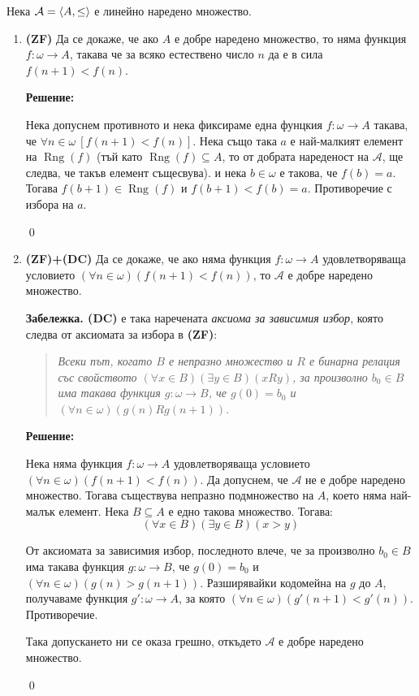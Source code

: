 \begin{problem}
Нека $\mathcal{A} = \langle A, \leq \rangle$ е линейно наредено множество.
\begin{enumerate}
\item
\textbf{(ZF)} Да се докаже, че ако $A$ е добре наредено множество, то
няма функция $f: \omega \to A$, такава че за всяко естествено число $n$ да
е в сила $f (n + 1) < f (n)$.

\textbf{Решение:}

\smallbreak
\quad
Нека допуснем противното и
нека фиксираме една фунцкия $f: \omega \to A$ такава, че $\forall n \in \omega\ [f(n+1) < f(n)]$.
Нека също така $a$ е най-малкият елемент на $\operatorname{Rng}(f)$
(тъй като $\operatorname{Rng}(f) \subseteq A$, то от добрата нареденост на $\mathcal{A}$, ще следва, че такъв елемент същесвува).
и нека $b \in \omega$ е такова, че $f(b) = a$.
Тогава $f(b+1) \in \operatorname{Rng}(f)$ и $f(b+1) < f(b) = a$.
Противоречие с избора на $a$.

\qed

\item
\textbf{(ZF)+(DC)}
Да се докаже, че ако няма функция $f: \omega \to A$
удовлетворяваща условието $(\forall n \in \omega)(f(n+1) < f(n))$, то $\mathcal{A}$ е добре наредено множество.

\textbf{Забележка. (DC)} е така наречената \textit{аксиома за зависимия избор},
която следва от аксиомата за избора в \textbf{(ZF)}:
\begin{quote}
\textit{
Всеки път, когато $B$ е непразно множество и $R$ е бинарна
релация със свойството $(\forall x \in B)(\exists y \in B)(xRy)$,
за произволно $b_0 \in B$ има такава функция $g: \omega \to B$, че $g(0) = b_0$ и
$(\forall n \in \omega)(g(n)Rg(n + 1))$.
}
\end{quote}

\textbf{Решение:}

\smallbreak
\quad
Нека няма функция $f: \omega \to A$ удовлетворяваща условието $(\forall n \in \omega)(f(n+1) < f(n))$.
Да допуснем, че $\mathcal{A}$ не е добре наредено множество.
Тогава съществува непразно подмножество на $A$,
което няма най-малък елемент.
Нека $B \subseteq A$ е едно такова множество.
Тогава:
\[
(\forall x \in B)(\exists y \in B)(x > y)
\]

\quad
От аксиомата за зависимия избор, последното влече, че
за произволно $b_0 \in B$ има такава функция $g: \omega \to B$, че $g(0) = b_0$ и
$(\forall n \in \omega)(g(n) > g(n + 1))$.
Разширявайки кодомейна на $g$ до $A$, получаваме функция $g': \omega \to A$,
за която $(\forall n \in \omega)(g'(n+1) < g'(n))$.
Противоречие.

\quad
Така допускането ни се оказа грешно, откъдето $\mathcal{A}$ е добре наредено множество.

\qed

\end{enumerate}
\end{problem}
